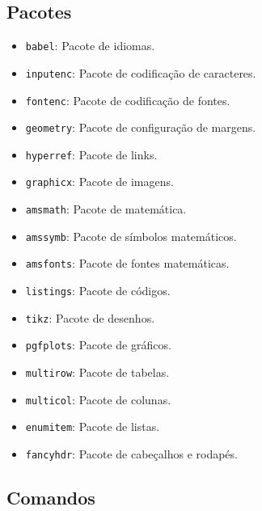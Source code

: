 \documentclass[a4paper, 12pt]{article}
\begin{document}
\subsection{Pacotes}\label{pacotes}


\begin{itemize}

    \item \texttt{babel}: Pacote de idiomas.
    \item \texttt{inputenc}: Pacote de codificação de caracteres.
    \item \texttt{fontenc}: Pacote de codificação de fontes.
    \item \texttt{geometry}: Pacote de configuração de margens.
    \item \texttt{hyperref}: Pacote de links.

    \item \texttt{graphicx}: Pacote de imagens.
    \item \texttt{amsmath}: Pacote de matemática.
    \item \texttt{amssymb}: Pacote de símbolos matemáticos.

    \item \texttt{amsfonts}: Pacote de fontes matemáticas.
    \item \texttt{listings}: Pacote de códigos.
    \item \texttt{tikz}: Pacote de desenhos.
    \item \texttt{pgfplots}: Pacote de gráficos.
    \item \texttt{multirow}: Pacote de tabelas.
    \item \texttt{multicol}: Pacote de colunas.
    \item \texttt{enumitem}: Pacote de listas.
    \item \texttt{fancyhdr}: Pacote de cabeçalhos e rodapés.
\end{itemize}

\subsection{Comandos}\label{comandos}
\end{document}
